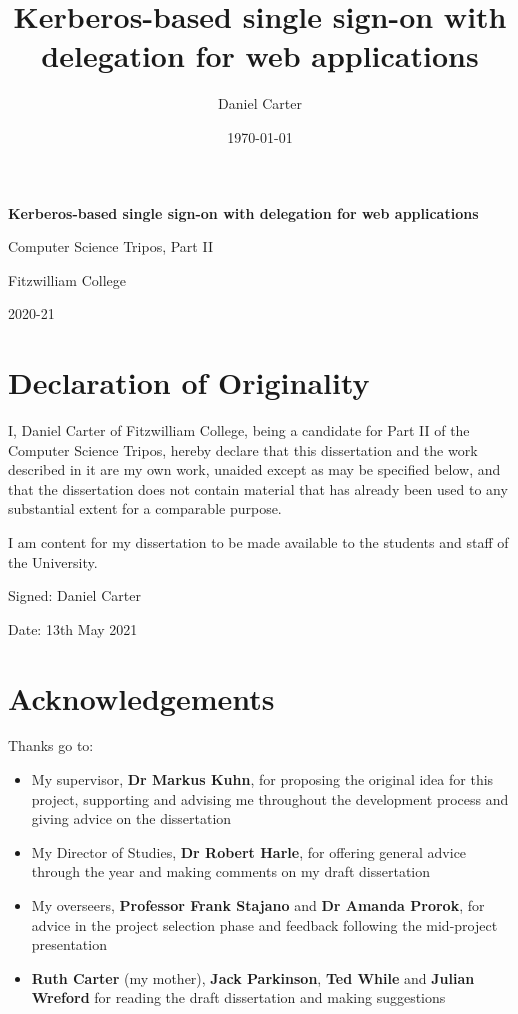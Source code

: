 \documentclass[12pt]{report}
\title{Kerberos-based single sign-on with delegation for web applications}
\author{Daniel Carter}
\date {\today}
\begin{document}

\begin{titlepage}
  \vfill
  \begin{center}
    \huge{
      \textbf{Kerberos-based single sign-on with delegation for web applications}

     Computer Science Tripos, Part II

     Fitzwilliam College

     2020-21
    }
  \end{center}
  \vfill
\end{titlepage}

\section*{Declaration of Originality}
I, Daniel Carter of Fitzwilliam College, being a candidate for Part II of the Computer Science Tripos, hereby declare that this dissertation and the work described in it are my own work, unaided except as may be specified below, and that the dissertation does not contain material that has already been used to any substantial extent for a comparable purpose.

I am content for my dissertation to be made available to the students and staff of the University.

Signed: Daniel Carter

Date: 13th May 2021

\section*{Acknowledgements}
Thanks go to:
\begin{itemize}
\item
  My supervisor, \textbf{Dr Markus Kuhn}, for proposing the original idea for this project, supporting and advising me throughout the development process and giving advice on the dissertation
\item
  My Director of Studies, \textbf{Dr Robert Harle}, for offering general advice through the year and making comments on my draft dissertation
\item
  My overseers, \textbf{Professor Frank Stajano} and \textbf{Dr Amanda Prorok}, for advice in the project selection phase and feedback following the mid-project presentation
\item
  \textbf{Ruth Carter} (my mother), \textbf{Jack Parkinson}, \textbf{Ted While} and \textbf{Julian Wreford} for reading the draft dissertation and making suggestions
\end{itemize}
\end{document}
